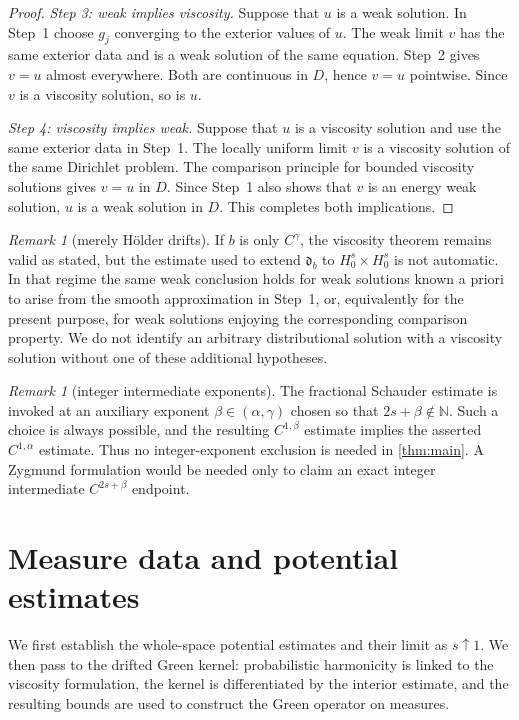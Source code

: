 \documentclass[reqno]{amsart}
\numberwithin{equation}{section}
\theoremstyle{plain}
\theoremstyle{definition}
\theoremstyle{remark}
\newtheorem{remark}[theorem]{Remark}
\newcommand{\rev}[1]{#1}
\begin{document}
\begin{proof}
\smallskip
\noindent\emph{Step 3: weak implies viscosity.}
Suppose that $u$ is a weak solution.  In Step~1 choose $g_j$ converging to
the exterior values of $u$.  The weak limit $v$ has the same exterior data
and is a weak solution of the same equation.  Step~2 gives $v=u$ almost
everywhere.  Both are continuous in $D$, hence $v=u$ pointwise.  Since $v$
is a viscosity solution, so is $u$.

\smallskip
\noindent\emph{Step 4: viscosity implies weak.}
Suppose that $u$ is a viscosity solution and use the same exterior data in
Step~1.  The locally uniform limit $v$ is a viscosity solution of the same
Dirichlet problem.  The comparison principle for bounded viscosity
solutions gives $v=u$ in $D$.  Since Step~1 also shows that $v$ is an energy
weak solution, $u$ is a weak solution in $D$.  This completes both
implications.
\end{proof}

\begin{remark}[merely H\"older drifts]\label{rem:holder-equivalence}
If $b$ is only $C^\gamma$, the viscosity theorem remains valid as
stated, but the estimate used to extend $\mathfrak d_b$ to
$H_0^s\times H_0^s$ is not automatic.  In that regime the same weak
conclusion holds for weak solutions known a priori to arise from the smooth
approximation in Step~1, or, equivalently for the present purpose, for weak
solutions enjoying the corresponding comparison property.  We do not
identify an arbitrary distributional solution with a viscosity solution
without one of these additional hypotheses.
\end{remark}

\begin{remark}[integer intermediate exponents]
The fractional Schauder estimate is invoked at an auxiliary exponent
$\beta\in(\alpha,\gamma)$ chosen so that
$2s+\beta\notin\mathbb N$.  Such a choice is always possible,
and the resulting $C^{1,\beta}$ estimate implies the asserted
$C^{1,\alpha}$ estimate.  Thus no integer-exponent exclusion is needed in
\cref{thm:main}.  A Zygmund formulation would be needed only to claim an
exact integer intermediate $C^{2s+\beta}$ endpoint.
\end{remark}

\section{Measure data and potential estimates}\label{sec:measure}

\rev{We first establish the whole-space potential estimates and their limit
as $s\uparrow1$.  We then pass to the drifted Green kernel: probabilistic
harmonicity is linked to the viscosity formulation, the kernel is
differentiated by the interior estimate, and the resulting bounds are used
to construct the Green operator on measures.}
\end{document}
